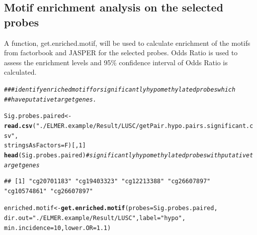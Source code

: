 \documentclass{article}\usepackage[]{graphicx}\usepackage[usenames,dvipsnames]{color}
\makeatletter
\newcommand{\hlnum}[1]{\textcolor[rgb]{0.686,0.059,0.569}{#1}}%
\newcommand{\hlstr}[1]{\textcolor[rgb]{0.192,0.494,0.8}{#1}}%
\newcommand{\hlcom}[1]{\textcolor[rgb]{0.678,0.584,0.686}{\textit{#1}}}%
\newcommand{\hlstd}[1]{\textcolor[rgb]{0.345,0.345,0.345}{#1}}%
\newcommand{\hlkwb}[1]{\textcolor[rgb]{0.69,0.353,0.396}{#1}}%
\newcommand{\hlkwc}[1]{\textcolor[rgb]{0.333,0.667,0.333}{#1}}%
\newcommand{\hlkwd}[1]{\textcolor[rgb]{0.737,0.353,0.396}{\textbf{#1}}}%
\newenvironment{kframe}{%
 \def\at@end@of@kframe{}%
 \ifinner\ifhmode%
  \def\at@end@of@kframe{\end{minipage}}%
  \begin{minipage}{\columnwidth}%
 \fi\fi%
 \def\FrameCommand##1{\hskip\@totalleftmargin \hskip-\fboxsep
 \colorbox{shadecolor}{##1}\hskip-\fboxsep
     \hskip-\linewidth \hskip-\@totalleftmargin \hskip\columnwidth}%
 \MakeFramed {\advance\hsize-\width
   \@totalleftmargin\z@ \linewidth\hsize
   \@setminipage}}%
 {\par\unskip\endMakeFramed%
 \at@end@of@kframe}
\newenvironment{knitrout}{}{} %
\makeatother
\begin{document}
\subsection{Motif enrichment analysis on the selected probes}
A function, get.enriched.motif, will be used to calculate enrichment of the motifs from 
factorbook and JASPER for the selected probes. Odds Ratio is used to assess 
the enrichment levels and 95\% confidence interval of Odds Ratio is calculated.
\begin{knitrout}
\color{fgcolor}\begin{kframe}
\begin{alltt}
\hlcom{### identify enriched motif for significantly hypomethylated probes which }
\hlcom{##have putative target genes.}

\hlstd{Sig.probes.paired} \hlkwb{<-} \hlkwd{read.csv}\hlstd{(}\hlstr{"./ELMER.example/Result/LUSC/getPair.hypo.pairs.significant.csv"}\hlstd{,}
                              \hlkwc{stringsAsFactors}\hlstd{=F)[,}\hlnum{1}\hlstd{]}
\hlkwd{head}\hlstd{(Sig.probes.paired)} \hlcom{# significantly hypomethylated probes with putative target genes}
\end{alltt}
\begin{verbatim}
## [1] "cg20701183" "cg19403323" "cg12213388" "cg26607897" "cg10574861" "cg26607897"
\end{verbatim}
\begin{alltt}
\hlstd{enriched.motif} \hlkwb{<-}\hlkwd{get.enriched.motif}\hlstd{(}\hlkwc{probes}\hlstd{=Sig.probes.paired,}
                                    \hlkwc{dir.out}\hlstd{=}\hlstr{"./ELMER.example/Result/LUSC"}\hlstd{,} \hlkwc{label}\hlstd{=}\hlstr{"hypo"}\hlstd{,}
                                    \hlkwc{min.incidence} \hlstd{=} \hlnum{10}\hlstd{,}\hlkwc{lower.OR} \hlstd{=} \hlnum{1.1}\hlstd{)}
\end{alltt}



\end{kframe}
\end{knitrout}
\end{document}
